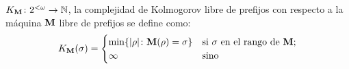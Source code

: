 \begin{definicion}\label{seleccion:def:prefixK}
\glossary{$\KM$}$K_{{\bf M}}\colon2^{<\omega} \to \mathbb{N}$, la complejidad de Kolmogorov libre de prefijos con respecto a la máquina ${\bf M}$ libre de prefijos se define como:
$$
K_{{\bf M}}(\sigma)=
    \begin{cases}
    \min \{| \rho |\colon {\bf M}(\rho)=\sigma \} & \textrm{si $\sigma$ en el rango de ${\bf M}$};\\
    \infty & \textrm{sino}
    \end{cases}
$$
\end{definicion}







